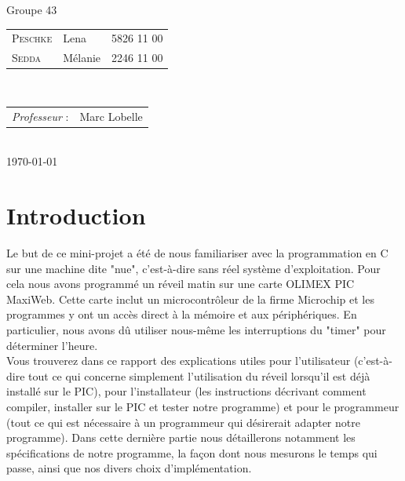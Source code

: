 \documentclass[12pt,a4paper]{article}
\begin{document}
\begin{titlepage}

\large
\begin{centering}
Groupe 43\\
\end{centering}
{\begin{tabular}{lll}
\textsc{Peschke} & Lena & 5826 11 00\\
\textsc{Sedda} & Mélanie & 2246 11 00\\
\end{tabular}}
\\[1cm]

\normalsize
{\begin{tabular}{ll}
\textit{Professeur} : & Marc Lobelle \\
\end{tabular}}
\\[1cm]


{\normalsize \today} %

\newpage

\end{titlepage}


\clearpage
\thispagestyle{empty}
\tableofcontents
\clearpage
{}


\section{Introduction}

Le but de ce mini-projet a été de nous familiariser avec la programmation en C sur une machine dite "nue", c'est-à-dire sans réel système d'exploitation. Pour cela nous avons programmé un réveil matin sur une carte OLIMEX PIC MaxiWeb. Cette carte inclut un microcontrôleur de la firme Microchip et les programmes y ont un accès direct à la mémoire et aux périphériques. En particulier, nous avons dû utiliser nous-même les interruptions du "timer" pour déterminer l'heure.\\

Vous trouverez dans ce rapport des explications utiles pour l'utilisateur (c'est-à-dire tout ce qui concerne simplement l'utilisation du réveil lorsqu'il est déjà installé sur le PIC), pour l'installateur (les instructions décrivant comment compiler, installer sur le PIC et tester notre programme) et pour le programmeur (tout ce qui est nécessaire à un programmeur qui désirerait adapter notre programme). Dans cette dernière partie nous détaillerons notamment les spécifications de notre programme, la façon dont nous mesurons le temps qui passe, ainsi que nos divers choix d'implémentation.
\end{document}
